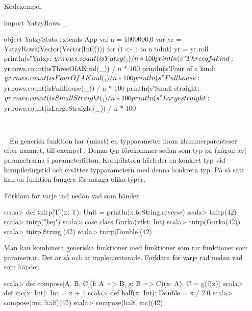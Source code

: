 Kodexempel:
\begin{CodeSmall}
import YatzyRows._

object YatzyStats extends App {
  val n = 1000000.0
  var yr = YatzyRows(Vector(Vector[Int]()))
  for (i <- 1 to n.toInt) yr = yr.roll
  println(s"Yatzy: ${yr.rows.count(isYatzy(_)) / n * 100}%
  println(s"Three of a kind: ${yr.rows.count(isThreeOfAKind(_)) / n * 100}%
  println(s"Four of a kind: ${yr.rows.count(isFourOfAKind(_)) / n * 100}%
  println(s"Full house: ${yr.rows.count(isFullHouse(_)) / n * 100}%
  println(s"Small straight: ${yr.rows.count(isSmallStraight(_)) / n * 100}%
  println(s"Large straight: ${yr.rows.count(isLargeStraight(_)) / n * 100}%
}
\end{CodeSmall}

\SubtaskSolved  --

\QUESTEND






\clearpage

\AdvancedTasks %



\QUESTBEGIN

\Task  \what~  En generisk funktion har (minst) en typparameter inom klammerparenteser efter namnet, till exempel \code{[T]}. Denna typ förekommer sedan som typ på (någon av) parametrarna i parameterlistan. Kompilatorn härleder en konkret typ vid kompileringstid och ersätter typparametern med denna konkreta typ. På så sätt kan en funktion fungera för många olika typer.

\Subtask Förklara för varje rad nedan vad som händer.

\begin{REPL}
scala> def tnirp[T](x: T): Unit = println(x.toString.reverse)
scala> tnirp(42)
scala> tnirp("hej")
scala> case class Gurka(vikt: Int)
scala> tnirp(Gurka(42))
scala> tnirp[String](42)
scala> tnirp[Double](42)
\end{REPL}

\Subtask Man kan kombinera generiska funktioner med funktioner som tar funktioner som parametrar. Det är så  och  är implementerade. Förklara för varje rad nedan vad som händer.

\begin{REPL}
scala> def compose[A, B, C](f: A => B, g: B => C)(x: A): C = g(f(x))
scala> def inc(x: Int): Int = x + 1
scala> def half(x: Int): Double = x / 2.0
scala> compose(inc, half)(42)
scala> compose(half, inc)(42)
\end{REPL}

